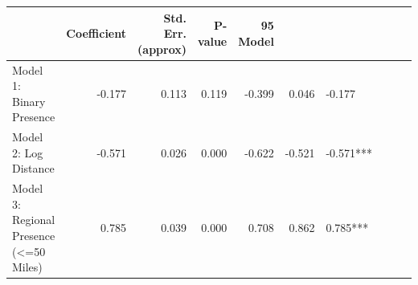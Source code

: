 \begin{tabular}{lrrrrrl}
\toprule
 & Coefficient & Std. Err. (approx) & P-value & 95%
Model &  &  &  &  &  &  \\
\midrule
Model 1: Binary Presence & -0.177 & 0.113 & 0.119 & -0.399 & 0.046 & -0.177 \\
Model 2: Log Distance & -0.571 & 0.026 & 0.000 & -0.622 & -0.521 & -0.571*** \\
Model 3: Regional Presence (<=50 Miles) & 0.785 & 0.039 & 0.000 & 0.708 & 0.862 & 0.785*** \\
\bottomrule
\end{tabular}
